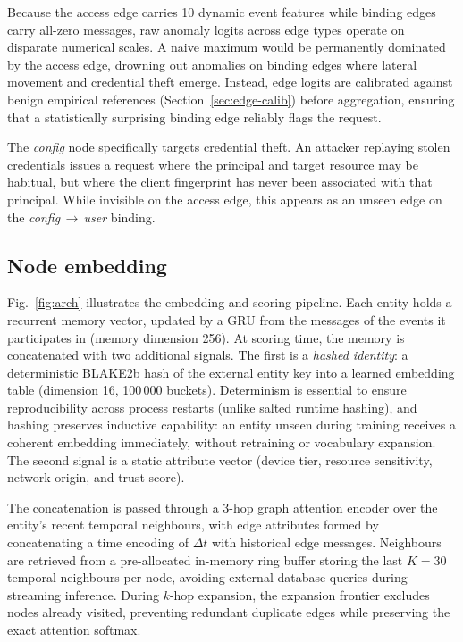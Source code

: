 Because the access edge carries 10 dynamic event features while binding edges carry all-zero
messages, raw anomaly logits across edge types operate on disparate numerical scales. A naive
maximum would be permanently dominated by the access edge, drowning out anomalies on binding
edges where lateral movement and credential theft emerge. Instead, edge logits are calibrated
against benign empirical references (Section~\ref{sec:edge-calib}) before aggregation, ensuring
that a statistically surprising binding edge reliably flags the request.

The \textit{config} node specifically targets credential theft. An attacker replaying stolen
credentials issues a request where the principal and target resource may be habitual, but
where the client fingerprint has never been associated with that principal. While invisible
on the access edge, this appears as an unseen edge on the
\textit{config}\,$\rightarrow$\,\textit{user} binding.

\subsection{Node embedding}

Fig.~\ref{fig:arch} illustrates the embedding and scoring pipeline. Each entity holds a
recurrent memory vector, updated by a GRU from the messages of the events it participates in
(memory dimension 256). At scoring time, the memory is concatenated with two additional signals.
The first is a \textit{hashed identity}: a deterministic BLAKE2b hash of the external entity
key into a learned embedding table (dimension 16, 100\,000 buckets). Determinism is essential to ensure
reproducibility across process restarts (unlike salted runtime hashing), and hashing preserves
inductive capability: an entity unseen during training receives a coherent embedding immediately,
without retraining or vocabulary expansion. The second signal is a static attribute vector (device tier,
resource sensitivity, network origin, and trust score).

The concatenation is passed through a 3-hop graph attention encoder over the entity's
recent temporal neighbours, with edge attributes formed by concatenating a time encoding
of $\Delta t$ with historical edge messages. Neighbours are retrieved from a pre-allocated
in-memory ring buffer storing the last $K{=}30$ temporal neighbours per node, avoiding
external database queries during streaming inference. During $k$-hop expansion, the expansion
frontier excludes nodes already visited, preventing redundant duplicate edges while preserving
the exact attention softmax.

